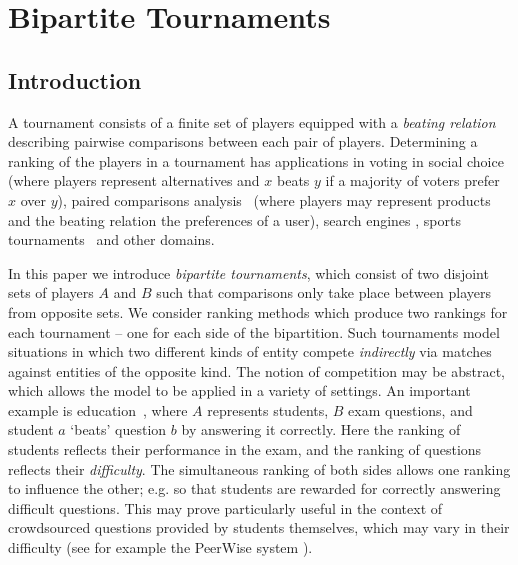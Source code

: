 \chapter{Bipartite Tournaments}
\label{chapter_bipartite_tournaments}

\section{Introduction}
\label{tourn_sec_introduction}

A tournament consists of a finite set of players equipped with a \emph{beating
relation} describing pairwise comparisons between each pair of players.
Determining a ranking of the players in a tournament has applications in voting
in social choice~\cite{brandt2016a} (where players represent alternatives and
$x$ beats $y$ if a majority of voters prefer $x$ over $y$), paired comparisons
analysis~\cite{gonzalez2014paired} (where players may represent products and
the beating relation the preferences of a user), search engines
\cite{slutzki2006scoring}, sports tournaments~\cite{bozoki2016application} and
other domains.

In this paper we introduce \emph{bipartite tournaments}, which consist of two
disjoint sets of players $A$ and $B$ such that comparisons only take place
between players from opposite sets. We consider ranking methods which produce
two rankings for each tournament -- one for each side of the bipartition. Such
tournaments model situations in which two different kinds of entity compete
\emph{indirectly} via matches against entities of the opposite kind.
%
The notion of competition may be abstract, which allows the model to be applied
in a variety of settings. An important example is
education~\cite{jiao2017algorithms}, where $A$ represents students, $B$ exam
questions, and student $a$ `beats' question $b$ by answering it correctly. Here
the ranking of students reflects their performance in the exam, and the ranking
of questions reflects their \emph{difficulty}. The simultaneous ranking of both
sides allows one ranking to influence the other; e.g. so that students are
rewarded for correctly answering difficult questions. This may prove
particularly useful in the context of crowdsourced questions provided by
students themselves, which may vary in their difficulty (see for example the
PeerWise system \cite{denny_peerwise_2008}).

